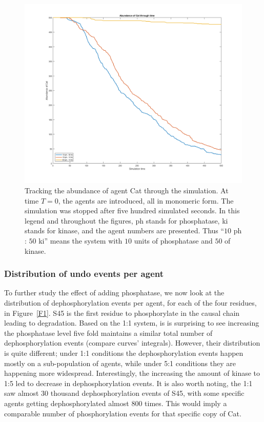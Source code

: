 \begin{figure}[p]
  \centering
  \includegraphics[scale=0.3]{wnt/F0_abundance_of_cat_through_time}
  \caption{Tracking the abundance of agent Cat through the
    simulation. At time $T=0$, the agents are introduced, all in
    monomeric form. The simulation was stopped after five hundred
    simulated seconds. In this legend and throughout the figures, ph
    stands for phosphatase, ki stands for kinase, and the agent
    numbers are presented. Thus ``$10$ ph : $50$ ki'' means the system
    with $10$ units of phosphatase and $50$ of kinase.}
  \label{F0}
\end{figure}

\subsubsection*{Distribution of undo events per agent}

To further study the effect of adding phosphatase, we now look at the
distribution of dephosphorylation events per agent, for each of the
four residues, in Figure~\ref{F1}. S45 is the first residue to
phosphorylate in the causal chain leading to degradation. Based on the
1:1 system, is is surprising to see increasing the phosphatase level
five fold maintains a similar total number of dephosphorylation events
(compare curves’ integrals). However, their distribution is quite
different; under 1:1 conditions the dephosphorylation events happen
mostly on a sub-population of agents, while under 5:1 conditions they
are happening more widespread. Interestingly, the increasing the
amount of kinase to 1:5 led to decrease in dephosphorylation
events. It is also worth noting, the 1:1 saw almost 30 thousand
dephosphorylation events of S45, with some specific agents getting
dephosphorylated almost 800 times. This would imply a comparable
number of phosphorylation events for that specific copy of Cat.

